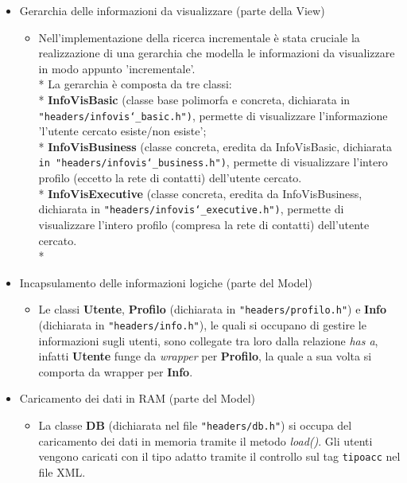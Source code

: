 \documentclass{article}
\begin{document}
\begin{itemize}
	\item Gerarchia delle informazioni da visualizzare (parte della View)
		\begin{itemize}
		\renewcommand\labelitemi{-}
			\item Nell'implementazione della ricerca incrementale è stata cruciale la realizzazione di una gerarchia
				  che modella le informazioni da visualizzare in modo appunto 'incrementale'.\\*
			      La gerarchia è composta da tre classi: \\*
			      \textbf{InfoVisBasic} (classe base polimorfa e concreta, dichiarata in \texttt{"headers/infovis\char`_basic.h")}, permette di visualizzare l'informazione
			      'l'utente cercato esiste/non esiste';\\*     
			      \textbf{InfoVisBusiness} (classe concreta, eredita da InfoVisBasic, dichiarata \texttt{in "headers/infovis\char`_business.h")}, permette di visualizzare l'intero 
			       profilo (eccetto la rete di contatti) dell'utente cercato.\\*
			      \textbf{InfoVisExecutive} (classe concreta, eredita da InfoVisBusiness, dichiarata in \texttt{"headers/infovis\char`_executive.h")}, permette di visualizzare l'intero
			        profilo (compresa la rete di contatti) dell'utente cercato.\\*
		\end{itemize}
	
	\item Incapsulamento delle informazioni logiche (parte del Model)
		\begin{itemize}
		\renewcommand\labelitemi{-}
			\item Le classi \textbf{Utente}, \textbf{Profilo} (dichiarata in \texttt{"headers/profilo.h"}) e \textbf{Info} (dichiarata in \texttt{"headers/info.h"}), 
			le quali si occupano di gestire le informazioni sugli utenti,
			sono collegate tra loro dalla relazione \textit{has a}, infatti \textbf{Utente} funge da \textit{wrapper} per \textbf{Profilo},
			la quale a sua volta si comporta da wrapper per \textbf{Info}.
		\end{itemize}
	\item Caricamento dei dati in RAM (parte del Model)
		\begin{itemize}
		\renewcommand\labelitemi{-}
			\item La classe \textbf{DB} (dichiarata nel file \texttt{"headers/db.h"}) si occupa del caricamento dei dati in memoria tramite il metodo \textit{load()}.
			Gli utenti vengono caricati con il tipo adatto tramite il controllo sul tag \texttt{tipoacc} nel file XML.
		\end{itemize}
	
\end{itemize}
\end{document}
